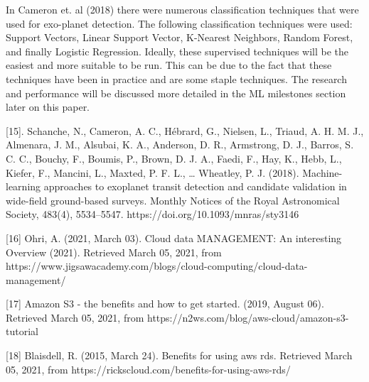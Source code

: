 In Cameron et. al (2018) there were numerous classification techniques that were used for exo-planet detection. The following classification techniques were used: Support Vectors, Linear Support Vector, K-Nearest Neighbors, Random Forest, and finally Logistic Regression. Ideally, these supervised techniques will be the easiest and more suitable to be run. This can be due to the fact that these techniques have been in practice and are some staple techniques. The research and performance will be discussed more detailed in the ML milestones section later on this paper.








[15].	Schanche, N., Cameron, A. C., Hébrard, G., Nielsen, L., Triaud, A. H. M. J., Almenara, J. 	M., Alsubai, K. A., Anderson, D. R., Armstrong, D. J., Barros, S. C. C., Bouchy, 	F., Boumis, P., Brown, D. J. A., Faedi, F., Hay, K., Hebb, L., Kiefer, F., Mancini, 	L., Maxted, P. F. L., … Wheatley, P. J. (2018). Machine-learning approaches to 	exoplanet transit detection and candidate validation in wide-field ground-based 	surveys. Monthly Notices of the Royal Astronomical Society, 483(4), 5534–5547. 	https://doi.org/10.1093/mnras/sty3146

[16] Ohri, A. (2021, March 03). Cloud data MANAGEMENT: An interesting Overview (2021). Retrieved March 05, 2021, from https://www.jigsawacademy.com/blogs/cloud-computing/cloud-data-management/

[17] Amazon S3 - the benefits and how to get started. (2019, August 06). Retrieved March 05, 2021, from https://n2ws.com/blog/aws-cloud/amazon-s3-tutorial

[18] Blaisdell, R. (2015, March 24). Benefits for using aws rds. Retrieved March 05, 2021, from https://rickscloud.com/benefits-for-using-aws-rds/